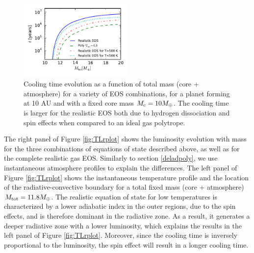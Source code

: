 \documentclass[apj]{emulateapj}
\begin{document}
\begin{figure}[h]
\centering
\includegraphics[width=0.5\textwidth]{../../figs/ModelAtmospheres/RadSelfGravRealEOS/PaperFigs/tplot.pdf}
\caption{Cooling time evolution as a function of total mass (core + atmosphere) for a variety of EOS combinations, for a planet forming at 10 AU and with a fixed core mass $M_{\rm c}=10 M_{\oplus}$. The cooling time is larger for the realistic EOS both due to hydrogen dissociation and spin effects when compared to an ideal gas polytrope.}
\label{fig:tplotall}
\end{figure}


The right panel of Figure \ref{fig:TLrplot} shows the luminosity evolution with mass for the three combinations of equations of state described above, as well as for the complete realistic gas EOS. Similarly to section \ref{deladpoly}, we use instantaneous atmosphere profiles to explain the differences. The left panel of Figure \ref{fig:TLrplot} shows the instantaneous temperature profile and the location of the radiative-convective boundary for a total fixed mass (core + atmosphere) $M_{\rm{tot}}=11.8 M_{\oplus}$. The realistic equation of state for low temperatures is characterized by a lower adiabatic index in the outer regions, due to the spin effects, and is therefore dominant in the radiative zone. As a result, it generates a deeper radiative zone with a lower luminosity, which explains the results in the left panel of Figure \ref{fig:TLrplot}. Moreover, since the cooling time is inversely proportional to the luminosity, the spin effect will result in a longer cooling time.
\end{document}
